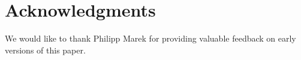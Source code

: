 \section{Acknowledgments} 

We would like to thank Philipp Marek for providing valuable feedback
on early versions of this paper.
